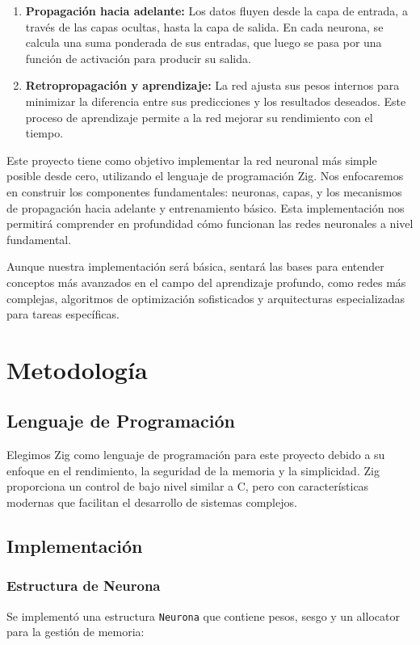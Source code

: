 \documentclass[twocolumn]{article}
\begin{document}
\begin{enumerate}
    \item \textbf{Propagación hacia adelante:} Los datos fluyen desde la capa de entrada, a través de las capas ocultas, hasta la capa de salida. En cada neurona, se calcula una suma ponderada de sus entradas, que luego se pasa por una función de activación para producir su salida.

    \item \textbf{Retropropagación y aprendizaje:} La red ajusta sus pesos internos para minimizar la diferencia entre sus predicciones y los resultados deseados. Este proceso de aprendizaje permite a la red mejorar su rendimiento con el tiempo.
\end{enumerate}

Este proyecto tiene como objetivo implementar la red neuronal más simple posible desde cero, utilizando el lenguaje de programación Zig. Nos enfocaremos en construir los componentes fundamentales: neuronas, capas, y los mecanismos de propagación hacia adelante y entrenamiento básico. Esta implementación nos permitirá comprender en profundidad cómo funcionan las redes neuronales a nivel fundamental.

Aunque nuestra implementación será básica, sentará las bases para entender conceptos más avanzados en el campo del aprendizaje profundo, como redes más complejas, algoritmos de optimización sofisticados y arquitecturas especializadas para tareas específicas.

\section{Metodología}
\subsection{Lenguaje de Programación}
Elegimos Zig como lenguaje de programación para este proyecto debido a su enfoque en el rendimiento, la seguridad de la memoria y la simplicidad. Zig proporciona un control de bajo nivel similar a C, pero con características modernas que facilitan el desarrollo de sistemas complejos.

\subsection{Implementación}

\subsubsection{Estructura de Neurona}
Se implementó una estructura \texttt{Neurona} que contiene pesos, sesgo y un allocator para la gestión de memoria:
\end{document}
